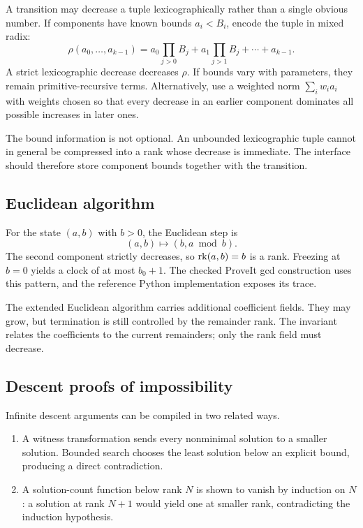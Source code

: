 A transition may decrease a tuple lexicographically rather than a single obvious
number.  If components have known bounds \(a_i<B_i\), encode the tuple in mixed radix:
\[
  \rho(a_0,\ldots,a_{k-1})
  =a_0\prod_{j>0}B_j+a_1\prod_{j>1}B_j+\cdots+a_{k-1}.
\]
A strict lexicographic decrease decreases \(\rho\).  If bounds vary with parameters,
they remain primitive-recursive terms.  Alternatively, use a weighted norm
\(\sum_i w_i a_i\) with weights chosen so that every decrease in an earlier component
dominates all possible increases in later ones.

The bound information is not optional.  An unbounded lexicographic tuple cannot in
general be compressed into a rank whose decrease is immediate.  The interface should
therefore store component bounds together with the transition.

\subsection{Euclidean algorithm}

For the state \((a,b)\) with \(b>0\), the Euclidean step is
\[
  (a,b)\longmapsto (b,a\bmod b).
\]
The second component strictly decreases, so \(\operatorname{rk}(a,b)=b\) is a rank.  Freezing at
\(b=0\) yields a clock of at most \(b_0+1\).  The checked ProveIt gcd construction uses
this pattern, and the reference Python implementation
 exposes its trace.

The extended Euclidean algorithm carries additional coefficient fields.  They may grow,
but termination is still controlled by the remainder rank.  The invariant relates the
coefficients to the current remainders; only the rank field must decrease.

\subsection{Descent proofs of impossibility}

Infinite descent arguments can be compiled in two related ways.

\begin{enumerate}[label=(\roman*),leftmargin=2.4em]
\item A witness transformation sends every nonminimal solution to a smaller solution.
Bounded search chooses the least solution below an explicit bound, producing a direct
contradiction.
\item A solution-count function below rank \(N\) is shown to vanish by induction on
\(N\): a solution at rank \(N+1\) would yield one at smaller rank, contradicting the
induction hypothesis.
\end{enumerate}

